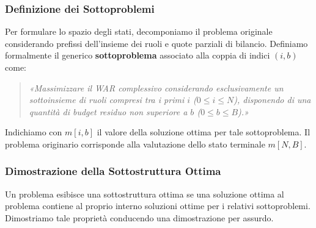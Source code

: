 \subsubsection{Definizione dei Sottoproblemi}
Per formulare lo spazio degli stati, decomponiamo il problema originale considerando prefissi dell'insieme dei ruoli e quote parziali di bilancio. Definiamo formalmente il generico \textbf{sottoproblema} associato alla coppia di indici $(i, b)$ come:
\begin{quote}
	\textit{«Massimizzare il WAR complessivo considerando esclusivamente un sottoinsieme di ruoli compresi tra i primi $i$ ($0 \le i \le N$), disponendo di una quantità di budget residuo non superiore a $b$ ($0 \le b \le B$).»}
\end{quote}
Indichiamo con $m[i, b]$ il valore della soluzione ottima per tale sottoproblema. Il problema originario corrisponde alla valutazione dello stato terminale $m[N, B]$.

\subsubsection{Dimostrazione della Sottostruttura Ottima}
Un problema esibisce una sottostruttura ottima se una soluzione ottima al problema contiene al proprio interno soluzioni ottime per i relativi sottoproblemi. Dimostriamo tale proprietà conducendo una dimostrazione per assurdo.

